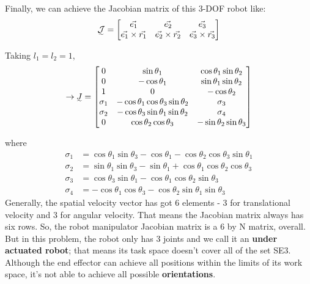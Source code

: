 \documentclass[conference]{IEEEtran}
\begin{document}
Finally, we can achieve the Jacobian matrix of this 3-DOF robot like:
\begin{align}
    \undertilde{\mathcal{J}} = \begin{bmatrix}
                                   \vec{e_1}                  & \vec{e_2}                  & \vec{e_3}                  \\
                                   \vec{e_1} \times \vec{r_1} & \vec{e_2} \times \vec{r_2} & \vec{e_3} \times \vec{r_3} \\
                               \end{bmatrix}
\end{align}

Taking $l_1 = l_2 = 1$,
\begin{align*}
    \rightarrow \undertilde{J} =
    \begin{bmatrix}
        0        & \sin \theta_1                                       & \cos \theta_1 \sin \theta_2        \\
        0        & -\cos \theta_1                                      & \sin \theta_1 \sin \theta_2        \\
        1        & 0                                                   & - \cos \theta_2                    \\
        \sigma_1 & -\cos  \theta_{1} \cos  \theta_{3} \sin  \theta_{2} & \sigma_3                           \\
        \sigma_2 & -\cos  \theta_{3} \sin  \theta_{1} \sin  \theta_{2} & \sigma_4                           \\
        0        & \cos  \theta_{2} \cos  \theta_{3}                   & -\sin  \theta_{2} \sin  \theta_{3}
    \end{bmatrix}
\end{align*}

where
\begin{align*}
    \sigma_1 & = \cos  \theta_{1} \sin  \theta_{3} -\cos  \theta_{1} -\cos  \theta_{2} \cos  \theta_{3} \sin  \theta_{1} \\
    \sigma_2 & = \sin  \theta_{1} \sin  \theta_{3} -\sin  \theta_{1} +\cos  \theta_{1} \cos  \theta_{2} \cos  \theta_{3} \\
    \sigma_3 & = \cos  \theta_{3} \sin  \theta_{1} -\cos  \theta_{1} \cos  \theta_{2} \sin  \theta_{3}                   \\
    \sigma_4 & = -\cos  \theta_{1} \cos  \theta_{3} -\cos  \theta_{2} \sin  \theta_{1} \sin  \theta_{3}
\end{align*}
Generally, the spatial velocity vector has got 6 elements - 3 for translational velocity and 3 for angular velocity. That means the Jacobian matrix always has six rows. So, the robot manipulator Jacobian matrix is a 6 by N matrix, overall. But in this problem, the robot only has 3 joints and we call it an \textbf{under actuated robot}; that means its task space doesn't cover all of the set SE3. Although the end effector can achieve all positions within the limits of its work space, it's not able to achieve all possible \textbf{orientations}.
\end{document}
